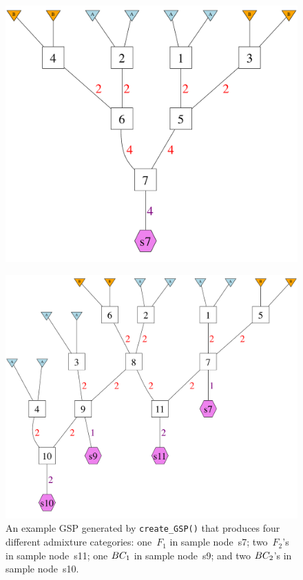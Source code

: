 \begin{figure}
\begin{center}
\includegraphics[width=\columnwidth]{figures/F2.pdf}
\end{center}
\caption[\gspcapone]{\gspcapone}
\label{fig:gsp1}
\end{figure}
\begin{figure}
\newcommand{\gspcaptwo}{\footnotesize
An example GSP generated by {\footnotesize\tt create\_GSP()} that produces four different
admixture categories: one~$F_1$ in sample node~s7; two~$F_2$'s in sample node~s11; one $\BC_1$ in sample node~s9; and two $\BC_2$'s in sample node~s10.
}
\begin{center}
\includegraphics[width=\columnwidth]{figures/AllThem.pdf}
\end{center}
\caption[\gspcaptwo]{\gspcaptwo}
\label{fig:gsp2}
\end{figure}

